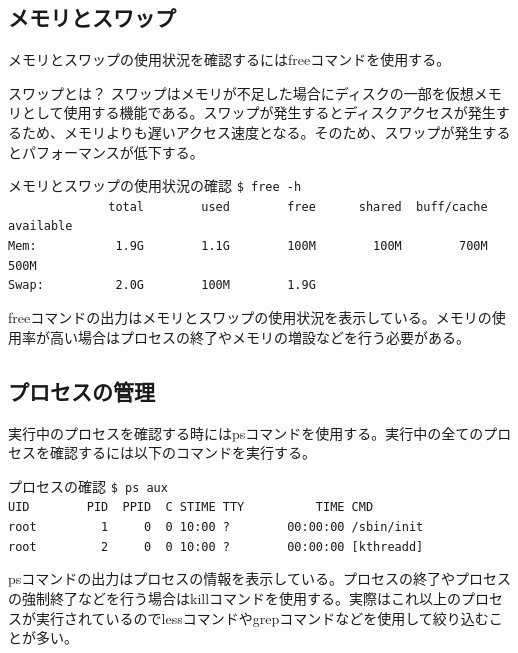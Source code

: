 \documentclass[a4paper, 11pt, dvipdfmx]{jsarticle}
\begin{document}
\subsection{メモリとスワップ}
メモリとスワップの使用状況を確認するにはfreeコマンドを使用する。
\begin{johobox}{スワップとは？}
  スワップはメモリが不足した場合にディスクの一部を仮想メモリとして使用する機能である。スワップが発生するとディスクアクセスが発生するため、メモリよりも遅いアクセス速度となる。そのため、スワップが発生するとパフォーマンスが低下する。 
\end{johobox}
  \begin{commandbox}{メモリとスワップの使用状況の確認}
    \verb|$ free -h|\\
    \verb|              total        used        free      shared  buff/cache   available|\\
    \verb|Mem:           1.9G        1.1G        100M        100M        700M        500M|\\
    \verb|Swap:          2.0G        100M        1.9G|
  \end{commandbox}
  freeコマンドの出力はメモリとスワップの使用状況を表示している。メモリの使用率が高い場合はプロセスの終了やメモリの増設などを行う必要がある。
\subsection{プロセスの管理}
実行中のプロセスを確認する時にはpsコマンドを使用する。実行中の全てのプロセスを確認するには以下のコマンドを実行する。
  \begin{commandbox}{プロセスの確認}
    \verb|$ ps aux|\\
    \verb|UID        PID  PPID  C STIME TTY          TIME CMD|\\
    \verb|root         1     0  0 10:00 ?        00:00:00 /sbin/init|\\
    \verb|root         2     0  0 10:00 ?        00:00:00 [kthreadd]|
  \end{commandbox}
  psコマンドの出力はプロセスの情報を表示している。プロセスの終了やプロセスの強制終了などを行う場合はkillコマンドを使用する。実際はこれ以上のプロセスが実行されているのでlessコマンドやgrepコマンドなどを使用して絞り込むことが多い。
\end{document}
